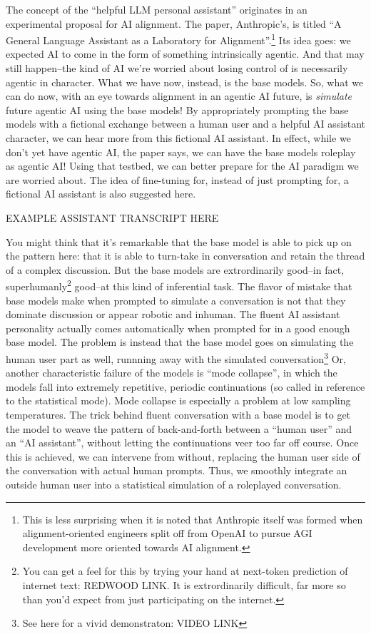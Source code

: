 The concept of the ``helpful LLM personal assistant'' originates in an
experimental proposal for AI alignment. The paper, Anthropic's, is titled ``A
General Language Assistant as a Laboratory for
Alignment''\cite{askell2021assistant}.\footnote{This is less surprising when it
is noted that Anthropic itself was formed when alignment-oriented engineers
split off from OpenAI to pursue AGI development more oriented towards AI
alignment.} Its idea goes: we expected AI to come in the form of something
intrinsically agentic. And that may still happen--the kind of AI we're worried
about losing control of is necessarily agentic in character. What we have now,
instead, is the base models. So, what we can do now, with an eye towards
alignment in an agentic AI future, is \emph{simulate} future agentic AI using
the base models! By appropriately prompting the base models with a fictional
exchange between a human user and a helpful AI assistant character, we can hear
more from this fictional AI assistant. In effect, while we don't yet have
agentic AI, the paper says, we can have the base models roleplay as agentic AI!
Using that testbed, we can better prepare for the AI paradigm we are worried
about. The idea of fine-tuning for, instead of just prompting for, a fictional
AI assistant is also suggested here.

EXAMPLE ASSISTANT TRANSCRIPT HERE

You might think that it's remarkable that the base model is able to pick up on
the pattern here: that it is able to turn-take in conversation and retain the
thread of a complex discussion. But the base models are extrordinarily good--in
fact, superhumanly\footnote{You can get a feel for this by trying your hand at
next-token prediction of internet text: REDWOOD LINK. It is extrordinarily
difficult, far more so than you'd expect from just participating on the
internet.} good--at this kind of inferential task. The flavor of mistake that
base models make when prompted to simulate a conversation is not that they
dominate discussion or appear robotic and inhuman. The fluent AI assistant
personality actually comes automatically when prompted for in a good enough
base model. The problem is instead that the base model goes on simulating the
human user part as well, runnning away with the simulated
conversation\footnote{See here for a vivid demonstraton: VIDEO LINK} Or,
another characteristic failure of the models is ``mode collapse'', in which the
models fall into extremely repetitive, periodic continuations (so called in
reference to the statistical mode). Mode collapse is especially a problem at
low sampling temperatures. The trick behind fluent conversation with a base
model is to get the model to weave the pattern of back-and-forth between a
``human user'' and an ``AI assistant'', without letting the continuations veer
too far off course. Once this is achieved, we can intervene from without,
replacing the human user side of the conversation with actual human prompts.
Thus, we smoothly integrate an outside human user into a statistical simulation
of a roleplayed conversation.

